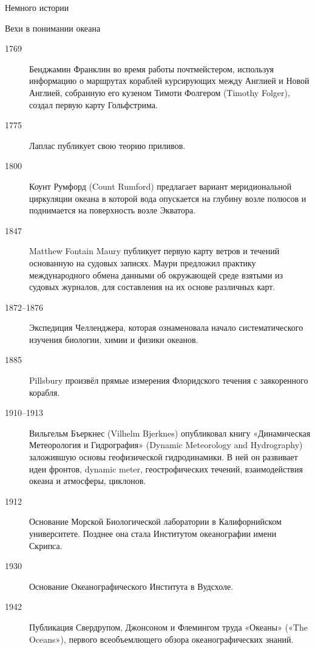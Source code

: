 \begin{chapter}{Немного истории}
\begin{section}{Вехи в понимании океана}
\begin{description}
\item[1769] Бенджамин Франклин во время работы почтмейстером,
используя информацию о маршрутах кораблей курсирующих между Англией и
Новой Англией, собранную его кузеном Тимоти Фолгером (Timothy Folger),
создал первую карту Гольфстрима.

\item[1775] Лаплас публикует свою теорию приливов.

\item[1800] Коунт Румфорд (Count Rumford) предлагает вариант
меридиональной циркуляции океана в которой вода опускается на глубину
возле полюсов и поднимается на поверхность возле Экватора.

\item[1847] Matthew Fontain Maury публикует первую карту ветров и
течений основанную на судовых записях. Маури предложил практику
международного обмена данными об окружающей среде взятыми из судовых
журналов, для составления на их основе различных карт.

\item[1872--1876] Экспедиция Челленджера, которая ознаменовала начало
систематического изучения биологии, химии и физики океанов.

\item[1885] Pillsbury произвёл прямые измерения Флоридского течения с
заякоренного корабля.

\item[1910--1913] Вильгельм Бъеркнес (Vilhelm Bjerknes) опубликовал
книгу «Динамическая Метеорология и Гидрография» (Dynamic Meteorology
and Hydrography) заложившую основы геофизической гидродинамики. В ней
он развивает идеи фронтов, dynamic meter, геострофических течений,
взаимодействия океана и атмосферы, циклонов.

\item[1912] Основание Морской Биологической лаборатории в
Калифорнийском университете. Позднее она стала Институтом океанографии
имени Скрипса.

\item[1930] Основание Океанографического Института в Вудсхоле.


\item[1942] Публикация Свердрупом, Джонсоном и Флемингом труда
«Океаны» («The Oceans»), первого всеобъемлющего обзора
океанографических знаний.


\end{description}
\end{section}
\end{chapter}
